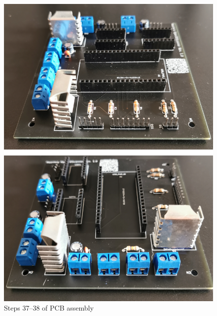 \begin{figure}[ht!]%
	\begin{centered}%
		\includegraphics[width=\linewidth]{images/PcbSeries7.jpg}%
		\caption{Steps \numrange[text-rm=\lightBoldFont]{37}{38} of PCB assembly}%
	\end{centered}%
\end{figure}%